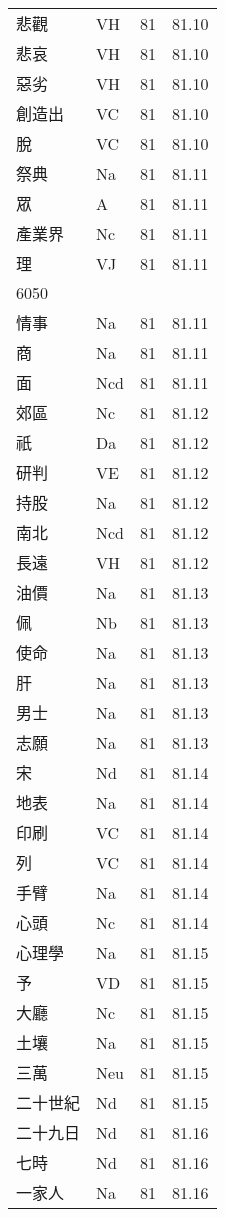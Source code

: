 \documentclass[twocolumn]{book}
\begin{document}
\begin{supertabular}{llrr}
悲觀 & VH & 81 &  81.10\\
悲哀 & VH & 81 &  81.10\\
惡劣 & VH & 81 &  81.10\\
創造出 & VC & 81 &  81.10\\
脫 & VC & 81 &  81.10\\
祭典 & Na & 81 &  81.11\\
眾 & A & 81 &  81.11\\
產業界 & Nc & 81 &  81.11\\
理 & VJ & 81 &  81.11\\
6050\\
情事 & Na & 81 &  81.11\\
商 & Na & 81 &  81.11\\
面 & Ncd & 81 &  81.11\\
郊區 & Nc & 81 &  81.12\\
祇 & Da & 81 &  81.12\\
研判 & VE & 81 &  81.12\\
持股 & Na & 81 &  81.12\\
南北 & Ncd & 81 &  81.12\\
長遠 & VH & 81 &  81.12\\
油價 & Na & 81 &  81.13\\
佩 & Nb & 81 &  81.13\\
使命 & Na & 81 &  81.13\\
肝 & Na & 81 &  81.13\\
男士 & Na & 81 &  81.13\\
志願 & Na & 81 &  81.13\\
宋 & Nd & 81 &  81.14\\
地表 & Na & 81 &  81.14\\
印刷 & VC & 81 &  81.14\\
列 & VC & 81 &  81.14\\
手臂 & Na & 81 &  81.14\\
心頭 & Nc & 81 &  81.14\\
心理學 & Na & 81 &  81.15\\
予 & VD & 81 &  81.15\\
大廳 & Nc & 81 &  81.15\\
土壤 & Na & 81 &  81.15\\
三萬 & Neu & 81 &  81.15\\
二十世紀 & Nd & 81 &  81.15\\
二十九日 & Nd & 81 &  81.16\\
七時 & Nd & 81 &  81.16\\
一家人 & Na & 81 &  81.16\\

\end{supertabular}
\end{document}
